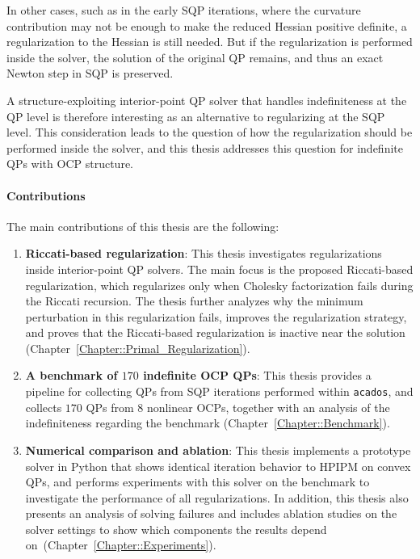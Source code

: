 \documentclass[class=scrbook, crop=false]{standalone}
\begin{document}
In other cases, such as in the early \gls{SQP} iterations,
where the curvature contribution may not be enough to make the reduced Hessian positive definite, 
a regularization to the Hessian is still needed.
But if the regularization is performed inside the solver, 
the solution of the original \gls{QP} remains, and thus an exact Newton step in \gls{SQP} is preserved.

A structure-exploiting interior-point \gls{QP} solver that handles indefiniteness at the \gls{QP} level is 
therefore interesting as an alternative to regularizing at the \gls{SQP} level.
This consideration leads to the question of how the regularization should be performed inside the solver,
and this thesis addresses this question for indefinite \glspl{QP} with \gls{OCP} structure.

\paragraph{Contributions}
The main contributions of this thesis are the following:
\begin{enumerate}
    \item \textbf{Riccati-based regularization}: 
    This thesis investigates regularizations inside interior-point \gls{QP} solvers.
    The main focus is the proposed Riccati-based regularization,
    which regularizes only when Cholesky factorization fails during the Riccati recursion.
    The thesis further analyzes why the minimum perturbation in this regularization fails,
    improves the regularization strategy, 
    and proves that the Riccati-based regularization is inactive near the solution (Chapter~\ref{Chapter::Primal_Regularization}).

    \item \textbf{A benchmark of $170$ indefinite \gls{OCP} \glspl{QP}}:
    This thesis provides a pipeline for collecting \glspl{QP} from \gls{SQP} iterations performed within \texttt{acados},
    and collects $170$ \glspl{QP} from $8$ nonlinear \glspl{OCP},
    together with an analysis of the indefiniteness regarding the benchmark (Chapter~\ref{Chapter::Benchmark}).

    \item \textbf{Numerical comparison and ablation}:
    This thesis implements a prototype solver in Python that shows identical iteration behavior to HPIPM on convex \glspl{QP}, 
    and performs experiments with this solver on the benchmark to investigate the performance of all regularizations. 
    In addition, this thesis also presents an analysis of solving failures 
    and includes ablation studies on the solver settings to show which components the results depend on~(Chapter~\ref{Chapter::Experiments}).
\end{enumerate}
\end{document}
